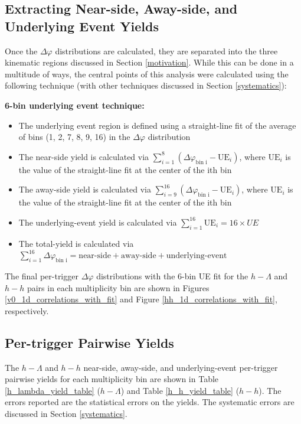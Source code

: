 \documentclass[ALICE,manyauthors]{ALICE_analysis_notes}
\begin{document}
\clearpage

\subsection{Extracting Near-side, Away-side, and Underlying Event Yields}
\label{yield_extraction}

Once the $\Delta\varphi$ distributions are calculated, they are separated into the three kinematic regions discussed in Section \ref{motivation}. While this can be done in a multitude of ways, the central points of this analysis were calculated using the following technique (with other techniques discussed in Section \ref{systematics}):

\textbf{6-bin underlying event technique:}
\begin{itemize}
\item The underlying event region is defined using a straight-line fit of the average of bins (1, 2, 7, 8, 9, 16) in the $\Delta\varphi$ distribution
\item The near-side yield is calculated via $\sum_{i=1}^{8} (\Delta\varphi_\text{bin i} - \text{UE}_i)$, where $\text{UE}_i$ is the value of the straight-line fit at the center of the ith bin
\item The away-side yield is calculated via $\sum_{i=9}^{16} (\Delta\varphi_\text{bin i} - \text{UE}_i)$, where $\text{UE}_i$ is the value of the straight-line fit at the center of the ith bin
\item The underlying-event yield is calculated via $\sum_{i=1}^{16} \text{UE}_i = 16 \times UE$
\item The total-yield is calculated via $\sum_{i=1}^{16} \Delta\varphi_\text{bin i} = \text{near-side} + \text{away-side} + \text{underlying-event}$
\end{itemize}

The final per-trigger $\Delta\varphi$ distributions with the 6-bin UE fit for the $h-\Lambda$ and $h-h$ pairs in each multiplicity bin are shown in Figures \ref{v0_1d_correlations_with_fit} and Figure \ref{hh_1d_correlations_with_fit}, respectively. 



\subsection{Per-trigger Pairwise Yields}

The $h-\Lambda$ and $h-h$ near-side, away-side, and underlying-event per-trigger pairwise yields for each multiplicity bin are shown in Table \ref{h_lambda_yield_table} ($h-\Lambda$) and Table \ref{h_h_yield_table} ($h-h$). The errors reported are the statistical errors on the yields. The systematic errors are discussed in Section \ref{systematics}.
\end{document}
